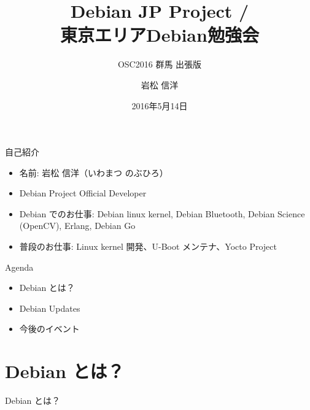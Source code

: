 \title{Debian JP Project / \\東京エリアDebian勉強会}
\subtitle{OSC2016 群馬 出張版}
\author{岩松 信洋}
\date{2016年5月14日}



\begin{frame}
\titlepage{}
\end{frame}


\begin{frame}{自己紹介}

\begin{itemize}
\item 名前: 岩松 信洋（いわまつ のぶひろ）
\item Debian Project Official Developer
\item Debian でのお仕事: Debian linux kernel, Debian Bluetooth, Debian Science (OpenCV), Erlang, Debian Go
\item 普段のお仕事: Linux kernel 開発、U-Boot メンテナ、Yocto Project
\end{itemize} 
\end{frame}

\begin{frame}{Agenda}
  \begin{itemize}
   \item Debian とは？
   \item Debian Updates
   \item 今後のイベント
  \end{itemize}
\end{frame}

\section{Debian とは？}
\begin{frame}\begin{center}\Huge{Debian とは？}\end{center}\end{frame}

